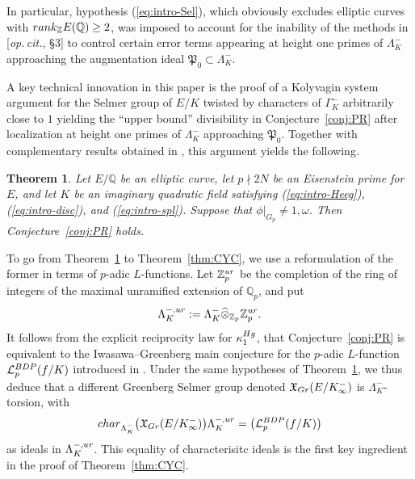 \documentclass[a4paper,10pt]{amsart}
\numberwithin{equation}{section}
\numberwithin{equation}{section}
\theoremstyle{plain}
\theoremstyle{definition}
\theoremstyle{definition}
\theoremstyle{plain}
\theoremstyle{plain}
\theoremstyle{plain}
\theoremstyle{plain}
\newtheorem{thmintro}{Theorem}
\newcommand{\Z}{\mathbb{Z}}
\newcommand{\Q}{\mathbb{Q}}
\newcommand{\X}{\mathfrak{X}}
\newcommand{\Lcal}{\mathcal{L}}
\begin{document}
In particular, hypothesis (\ref{eq:intro-Sel}), %
which obviously excludes elliptic curves with ${\rm rank}_\Z E(\Q)\geq 2$, was imposed to account for the inability of the methods in [\emph{op.\,cit.}, \S{3}] to control certain error terms appearing at height one primes of $\Lambda_K^-$ approaching the augmentation ideal $\mathfrak{P}_0\subset \Lambda_K^-$. 

A key technical innovation in this paper is the proof of a Kolyvagin system argument for the Selmer group of $E/K$ twisted by characters of $\Gamma_K^-$ arbitrarily close to $1$ yielding the ``upper bound''  divisibility in Conjecture~\ref{conj:PR} after localization at height one primes of $\Lambda_K^-$ approaching $\mathfrak{P}_0$. %
Together with complementary results obtained in \cite{eisenstein}, this argument yields the following.

\begin{thmintro}\label{thm:AC}
Let $E/\mathbb{Q}$ be an elliptic curve, let $p\nmid 2N$ be an Eisenstein prime for $E$, and let $K$ be an imaginary quadratic field satisfying {\rm (\ref{eq:intro-Heeg})}, {\rm (\ref{eq:intro-disc})}, and {\rm (\ref{eq:intro-spl})}. Suppose that   
$\phi\vert_{G_p}\neq 1,\omega$. Then Conjecture~\ref{conj:PR} holds.
\end{thmintro}

To go from Theorem~\ref{thm:AC} to Theorem~\ref{thm:CYC}, we use a reformulation of the former in terms of $p$-adic $L$-functions. Let $\Z_p^{\rm ur}$ be the completion of the ring of integers of the maximal unramified extension of $\Q_p$, and put
\[
\Lambda^{-,\rm ur}_K:=\Lambda_K^-\widehat\otimes_{\Z_p}\Z_p^{\rm ur}.
\]
It follows from the explicit reciprocity law for $\kappa_1^{\rm Hg}$, that Conjecture~\ref{conj:PR} is equivalent to the Iwasawa--Greenberg main conjecture for the $p$-adic $L$-function $\Lcal_p^{\rm BDP}(f/K)$ introduced in \cite{BDP}. %
Under the same hypotheses of Theorem~\ref{thm:AC}, we thus deduce that a different Greenberg Selmer group denoted $\X_{\rm Gr}(E/K_\infty^-)$ 
is $\Lambda_K^-$-torsion, with
\[
{\rm char}_{\Lambda_K^-}\bigl(\mathfrak{X}_{\rm Gr}(E/K_{\infty}^-)\bigr)\Lambda_K^{-,\rm ur}=\bigl(\Lcal_p^{\rm BDP}(f/K)\bigr)
\]
as ideals in $\Lambda_K^{-,\rm ur}$. This equality of characterisitc ideals is the first key ingredient in the proof of Theorem~\ref{thm:CYC}.
\end{document}
